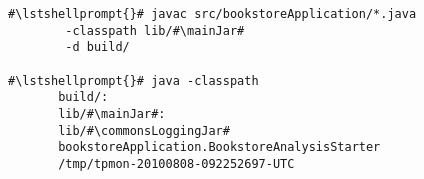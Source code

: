 \begin{lstlisting}[caption=Commands to compile and run the analysis under \UnixLikeSystems{},label=lst:bookstoreAnalysisStarterLinux] 			
#\lstshellprompt{}# javac src/bookstoreApplication/*.java
        -classpath lib/#\mainJar#
        -d build/

#\lstshellprompt{}# java -classpath
       build/:
       lib/#\mainJar#:
       lib/#\commonsLoggingJar#
       bookstoreApplication.BookstoreAnalysisStarter 
       /tmp/tpmon-20100808-092252697-UTC
\end{lstlisting}	
